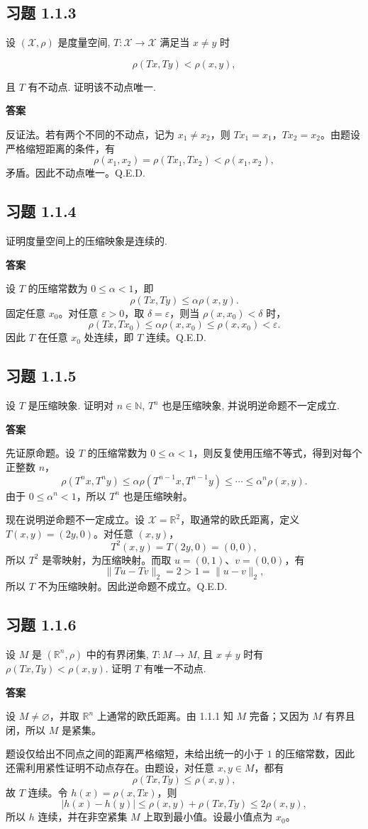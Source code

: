 \documentclass[UTF8,a4paper,11pt,fontset=fandol]{ctexart}
\newcommand{\exercise}[1]{\par\ifdim\dimexpr\pagegoal-\pagetotal\relax<7\baselineskip\newpage\fi\subsection*{习题 #1}}
\newcommand{\answer}{\par\smallskip\noindent\textbf{答案}\quad}
\newcommand{\qedherecustom}{\unskip\hfill\mbox{\normalfont Q.E.D.}\par}
\begin{document}
\exercise{1.1.3}

设 $(\mathcal X,\rho)$ 是度量空间, $T:\mathcal X\to\mathcal X$ 满足当 $x\ne y$ 时

\[
\rho(Tx,Ty)<\rho(x,y),
\]

且 $T$ 有不动点. 证明该不动点唯一.

\answer

反证法。若有两个不同的不动点，记为 $x_1\ne x_2$，则 $Tx_1=x_1$，$Tx_2=x_2$。由题设严格缩短距离的条件，有
\[
\rho(x_1,x_2)=\rho(Tx_1,Tx_2)<\rho(x_1,x_2),
\]
矛盾。因此不动点唯一。\qedherecustom

\exercise{1.1.4}

证明度量空间上的压缩映象是连续的.

\answer

设 $T$ 的压缩常数为 $0\leq\alpha<1$，即
\[
\rho(Tx,Ty)\leq\alpha\rho(x,y).
\]
固定任意 $x_0$。对任意 $\varepsilon>0$，取 $\delta=\varepsilon$，则当 $\rho(x,x_0)<\delta$ 时，
\[
\rho(Tx,Tx_0)\leq\alpha\rho(x,x_0)
\leq\rho(x,x_0)<\varepsilon.
\]
因此 $T$ 在任意 $x_0$ 处连续，即 $T$ 连续。\qedherecustom

\exercise{1.1.5}

设 $T$ 是压缩映象. 证明对 $n\in\mathbb N$, $T^n$ 也是压缩映象, 并说明逆命题不一定成立.

\answer

先证原命题。设 $T$ 的压缩常数为 $0\leq\alpha<1$，则反复使用压缩不等式，得到对每个正整数 $n$，
\[
\rho(T^nx,T^ny)\leq\alpha\rho(T^{n-1}x,T^{n-1}y)
\leq\cdots\leq\alpha^n\rho(x,y).
\]
由于 $0\leq\alpha^n<1$，所以 $T^n$ 也是压缩映射。

现在说明逆命题不一定成立。设 $\mathcal X=\mathbb R^2$，取通常的欧氏距离，定义 $T(x,y)=(2y,0)$。对任意 $(x,y)$，
\[
T^2(x,y)=T(2y,0)=(0,0),
\]
所以 $T^2$ 是零映射，为压缩映射。而取 $u=(0,1)$、$v=(0,0)$，有
\[
\|Tu-Tv\|_2=2>1=\|u-v\|_2,
\]
所以 $T$ 不为压缩映射。因此逆命题不成立。\qedherecustom

\exercise{1.1.6}

设 $M$ 是 $(\mathbb R^n,\rho)$ 中的有界闭集, $T:M\to M$, 且 $x\ne y$ 时有 $\rho(Tx,Ty)<\rho(x,y)$. 证明 $T$ 有唯一不动点.

\answer

设 $M\ne\varnothing$，并取 $\mathbb R^n$ 上通常的欧氏距离。由 1.1.1 知 $M$ 完备；又因为 $M$ 有界且闭，所以 $M$ 是紧集。

题设仅给出不同点之间的距离严格缩短，未给出统一的小于 $1$ 的压缩常数，因此还需利用紧性证明不动点存在。由题设，对任意 $x,y\in M$，都有
\[
\rho(Tx,Ty)\leq\rho(x,y),
\]
故 $T$ 连续。令 $h(x)=\rho(x,Tx)$，则
\[
|h(x)-h(y)|\leq\rho(x,y)+\rho(Tx,Ty)\leq2\rho(x,y),
\]
所以 $h$ 连续，并在非空紧集 $M$ 上取到最小值。设最小值点为 $x_0$。
\end{document}
